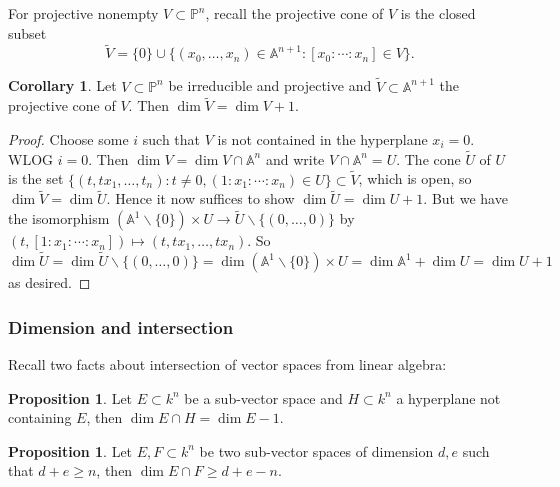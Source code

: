 \documentclass{article}
\newcommand{\A}{\mathbb{A}}
\newcommand{\p}{\mathbb{P}}
\theoremstyle{definition}
\newtheorem{prop}[defn]{Proposition}
\newtheorem{coro}[defn]{Corollary}
\begin{document}
For projective nonempty $V\subset\p^n$, recall the projective cone of $V$ is the closed subset
\[
\widetilde V=\{0\}\cup\{(x_0,\ldots,x_n)\in\A^{n+1}:[x_0:\cdots:x_n]\in V\}.
\]
\begin{coro}
\label{coro:dimofconeis1greater}
Let $V\subset\p^n$ be irreducible and projective and $\widetilde V\subset\A^{n+1}$ the projective cone of $V$. Then $\dim\widetilde V=\dim V+1$.
\end{coro}
\begin{proof}
Choose some $i$ such that $V$ is not contained in the hyperplane $x_i=0$. WLOG $i=0$. Then $\dim V=\dim V\cap\A^n$ and write $V\cap\A^n=U$. The cone $\widetilde U$ of $U$ is the set $\{(t,tx_1,\ldots,t_n):t\neq 0, (1:x_1:\cdots:x_n)\in U\}\subset\widetilde V$, which is open, so $\dim\widetilde V=\dim\widetilde U$. Hence it now suffices to show $\dim\widetilde U=\dim U+1$. But we have the isomorphism $(\A^1\backslash\{0\})\times U\rightarrow\widetilde U\backslash\{(0,\ldots,0)\}$ by $(t,[1:x_1:\cdots:x_n])\mapsto (t,tx_1,\ldots,tx_n)$. So
\[
\dim\widetilde U=\dim\widetilde U\backslash\{(0,\ldots,0)\}=\dim (\A^1\backslash\{0\})\times U=\dim \A^1+\dim U=\dim U+1
\]
as desired.
\end{proof}

\subsubsection{Dimension and intersection}
Recall two facts about intersection of vector spaces from linear algebra:
\begin{prop}
Let $E\subset k^n$ be a sub-vector space and $H\subset k^n$ a hyperplane not containing $E$, then $\dim E\cap H=\dim E-1$.
\end{prop}
\begin{prop}
Let $E,F\subset k^n$ be two sub-vector spaces of dimension $d,e$ such that $d+e\geq n$, then $\dim E\cap F\geq d+e-n$.
\end{prop}
\end{document}
